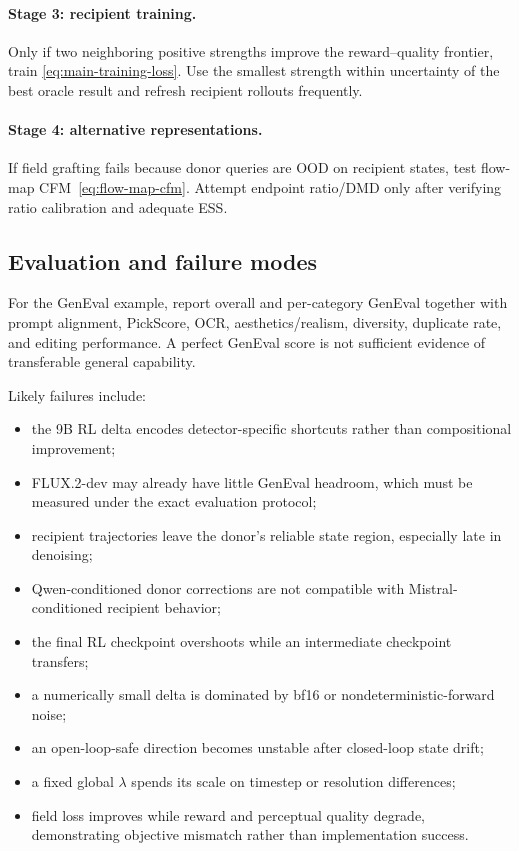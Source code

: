 \documentclass[11pt,a4paper]{article}
\theoremstyle{plain}
\theoremstyle{definition}
\begin{document}
\paragraph{Stage 3: recipient training.}
Only if two neighboring positive strengths improve the reward--quality frontier, train
\eqref{eq:main-training-loss}.  Use the smallest strength within uncertainty of the best oracle
result and refresh recipient rollouts frequently.

\paragraph{Stage 4: alternative representations.}
If field grafting fails because donor queries are OOD on recipient states, test
flow-map CFM~\eqref{eq:flow-map-cfm}.  Attempt endpoint ratio/DMD only after verifying ratio
calibration and adequate ESS.

\subsection{Evaluation and failure modes}

For the GenEval example, report overall and per-category GenEval together with prompt alignment,
PickScore, OCR, aesthetics/realism, diversity, duplicate rate, and editing performance.  A perfect
GenEval score is not sufficient evidence of transferable general capability.

Likely failures include:
\begin{itemize}[leftmargin=1.6em]
\item the 9B RL delta encodes detector-specific shortcuts rather than compositional improvement;
\item FLUX.2-dev may already have little GenEval headroom, which must be measured under the exact
      evaluation protocol;
\item recipient trajectories leave the donor's reliable state region, especially late in
      denoising;
\item Qwen-conditioned donor corrections are not compatible with Mistral-conditioned recipient
      behavior;
\item the final RL checkpoint overshoots while an intermediate checkpoint transfers;
\item a numerically small delta is dominated by bf16 or nondeterministic-forward noise;
\item an open-loop-safe direction becomes unstable after closed-loop state drift;
\item a fixed global $\lambda$ spends its scale on timestep or resolution differences;
\item field loss improves while reward and perceptual quality degrade, demonstrating objective
      mismatch rather than implementation success.
\end{itemize}
\end{document}
